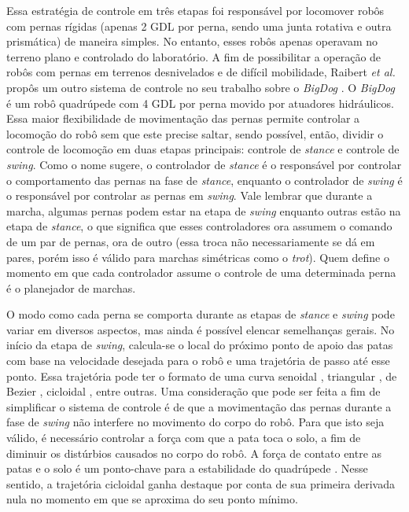 \documentclass[../main.tex]{subfiles}
\begin{document}
Essa estratégia de controle em três etapas foi responsável por locomover robôs com pernas rígidas (apenas 2 GDL por perna, sendo uma junta rotativa e outra prismática) de maneira simples. No entanto, esses robôs apenas operavam no terreno plano e controlado do laboratório. A fim de possibilitar a operação de robôs com pernas em terrenos desnivelados e de difícil mobilidade, Raibert \textit{et al.} propôs um outro sistema de controle no seu trabalho sobre o \textit{BigDog} \cite{RAIBERT200810822}. O \textit{BigDog} é um robô quadrúpede com 4 GDL por perna movido por atuadores hidráulicos. Essa maior flexibilidade de movimentação das pernas permite controlar a locomoção do robô sem que este precise saltar, sendo possível, então, dividir o controle de locomoção em duas etapas principais: controle de \textit{stance} e controle de \textit{swing}. Como o nome sugere, o controlador de \textit{stance} é o responsável por controlar o comportamento das pernas na fase de \textit{stance}, enquanto o controlador de \textit{swing} é o responsável por controlar as pernas em \textit{swing}. Vale lembrar que durante a marcha, algumas pernas podem estar na etapa de \textit{swing} enquanto outras estão na etapa de \textit{stance}, o que significa que esses controladores ora assumem o comando de um par de pernas, ora de outro (essa troca não necessariamente se dá em pares, porém isso é válido para marchas simétricas como o \textit{trot}). Quem define o momento em que cada controlador assume o controle de uma determinada perna é o planejador de marchas.

O modo como cada perna se comporta durante as etapas de \textit{stance} e \textit{swing} pode variar em diversos aspectos, mas ainda é possível elencar semelhanças gerais. No início da etapa de \textit{swing}, calcula-se o local do próximo ponto de apoio das patas com base na velocidade desejada para o robô e uma trajetória de passo até esse ponto. Essa trajetória pode ter o formato de uma curva senoidal \cite{X.118}, triangular \cite{StanfordPupper}, de Bezier \cite{HackadayQuadruped}, cicloidal \cite{Shi2021} \cite{X.58}, entre outras. Uma consideração que pode ser feita a fim de simplificar o sistema de controle é de que a movimentação das pernas durante a fase de \textit{swing} não interfere no movimento do corpo do robô. Para que isto seja válido, é necessário controlar a força com que a pata toca o solo, a fim de diminuir os distúrbios causados no corpo do robô. A força de contato entre as patas e o solo é um ponto-chave para a estabilidade do quadrúpede \cite{X.118}. Nesse sentido, a trajetória cicloidal ganha destaque por conta de sua primeira derivada nula no momento em que se aproxima do seu ponto mínimo.
\end{document}
